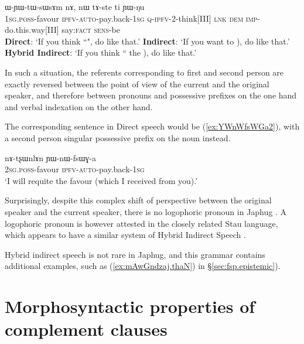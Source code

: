  \begin{exe}
 \ex \label{ex:YWnWfsWGa}
\gll  {}  	 ɯ-ɲɯ-tɯ-sɯsɤm nɤ, nɯ tɤ-ste ti ɲɯ-ŋu \\
  {\textsc{1sg}.\textsc{poss}-favour} {\textsc{ipfv}-\textsc{auto}-pay.back-\textsc{1sg}} \textsc{q}-\textsc{ipfv}-2-think[III] \textsc{lnk} \textsc{dem} \textsc{imp}-do.this.way[III] say:\textsc{fact} \textsc{sens}-be \\
\glt    \textbf{Direct}: `If you think ``", do like that.'
\glt    \textbf{Indirect}: `If you want to ), do like that.'
\glt   \textbf{Hybrid Indirect}: `If you think `` the ), do like that.'
\end{exe}

In such a situation, the referents corresponding to first and second person are exactly reversed between the point of view of the current and the original speaker, and therefore between pronouns and possessive prefixes on the one hand and verbal indexation on the other hand.
   
The corresponding sentence in Direct speech would be (\ref{ex:YWnWfsWGa2}), with a second person singular possessive prefix on the noun   instead.

\begin{exe}
\ex \label{ex:YWnWfsWGa2}
\gll nɤ-tʂɯnlɤn ɲɯ-nɯ-fsɯɣ-a \\
  {\textsc{2sg}.\textsc{poss}-favour} {\textsc{ipfv}-\textsc{auto}-pay.back-\textsc{1sg}} \\ 
 \glt `I will requite the favour (which I received from you).'
\end{exe}


Surprisingly, despite this complex shift of perspective between the original speaker and the current speaker, there is no logophoric pronoun in Japhug \citep{hagege74logophoriques, nikitina12logophoric}. A logophoric pronoun is however attested in the closely related Stau language, which appears to have a similar system of Hybrid Indirect Speech \citep{jacques17stau}.

Hybrid indirect speech is not rare in Japhug, and this grammar contains additional examples, such as  (\ref{ex:mAwGndzaj.thaN}) in §\ref{sec:fsp.epistemic}).



\section{Morphosyntactic properties of complement clauses}  \label{sec:complement.morphosyntax}
